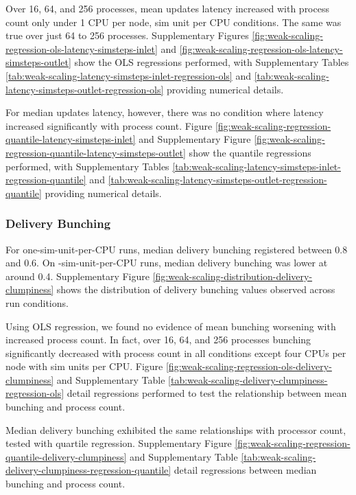 Over 16, 64, and 256 processes, mean updates latency increased with process count only under 1 CPU per node,  sim unit per CPU conditions.
The same was true over just 64 to 256 processes.
Supplementary Figures \ref{fig:weak-scaling-regression-ols-latency-simsteps-inlet} and \ref{fig:weak-scaling-regression-ols-latency-simsteps-outlet} show the OLS regressions performed, with
Supplementary Tables \ref{tab:weak-scaling-latency-simsteps-inlet-regression-ols} and \ref{tab:weak-scaling-latency-simsteps-outlet-regression-ols} providing numerical details.



For median updates latency, however, there was no condition where latency increased significantly with process count.
Figure \ref{fig:weak-scaling-regression-quantile-latency-simsteps-inlet} and Supplementary Figure \ref{fig:weak-scaling-regression-quantile-latency-simsteps-outlet} show the quantile regressions performed, with Supplementary Tables \ref{tab:weak-scaling-latency-simsteps-inlet-regression-quantile} and \ref{tab:weak-scaling-latency-simsteps-outlet-regression-quantile} providing numerical details.

\subsubsection{Delivery Bunching}

For one-sim-unit-per-CPU runs, median delivery bunching registered between 0.8 and 0.6.
On -sim-unit-per-CPU runs, median delivery bunching was lower at around 0.4.
Supplementary Figure \ref{fig:weak-scaling-distribution-delivery-clumpiness}
shows the distribution of delivery bunching values observed across run conditions.



Using OLS regression, we found no evidence of mean bunching worsening with increased process count.
In fact, over 16, 64, and 256 processes bunching significantly decreased with process count in all conditions except four CPUs per node with  sim units per CPU.
Figure \ref{fig:weak-scaling-regression-ols-delivery-clumpiness} and Supplementary Table \ref{tab:weak-scaling-delivery-clumpiness-regression-ols} detail regressions performed to test the relationship between mean bunching and process count.

Median delivery bunching exhibited the same relationships with processor count, tested with quartile regression.
Supplementary Figure \ref{fig:weak-scaling-regression-quantile-delivery-clumpiness} and Supplementary Table \ref{tab:weak-scaling-delivery-clumpiness-regression-quantile} detail regressions between median bunching and process count.

